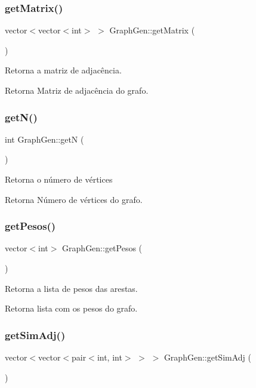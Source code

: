 \subsubsection{\texorpdfstring{getMatrix()}{getMatrix()}}
{\footnotesize\ttfamily vector$<$vector$<$int$>$ $>$ Graph\+Gen\+::get\+Matrix (\begin{DoxyParamCaption}{ }\end{DoxyParamCaption})}

Retorna a matriz de adjacência. \begin{DoxyReturn}{Retorna}
Matriz de adjacência do grafo. 
\end{DoxyReturn}
\mbox{\label{classGraphGen_a7447dc2fdc4cd3f86579811febfff1ad}} 
\subsubsection{\texorpdfstring{getN()}{getN()}}
{\footnotesize\ttfamily int Graph\+Gen\+::getN (\begin{DoxyParamCaption}{ }\end{DoxyParamCaption})}

Retorna o número de vértices \begin{DoxyReturn}{Retorna}
Número de vértices do grafo. 
\end{DoxyReturn}
\mbox{\label{classGraphGen_a56cb589bfd48135fe224d172dbed3155}} 
\subsubsection{\texorpdfstring{getPesos()}{getPesos()}}
{\footnotesize\ttfamily vector$<$int$>$ Graph\+Gen\+::get\+Pesos (\begin{DoxyParamCaption}{ }\end{DoxyParamCaption})}

Retorna a lista de pesos das arestas. \begin{DoxyReturn}{Retorna}
lista com os pesos do grafo. 
\end{DoxyReturn}
\mbox{\label{classGraphGen_ab37943d4526c45711622796c84e983ac}} 
\subsubsection{\texorpdfstring{getSimAdj()}{getSimAdj()}}
{\footnotesize\ttfamily vector$<$vector$<$pair$<$int, int$>$ $>$ $>$ Graph\+Gen\+::get\+Sim\+Adj (\begin{DoxyParamCaption}{ }\end{DoxyParamCaption})}

